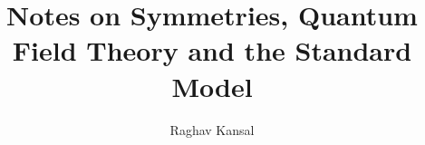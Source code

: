 \documentclass[12pt]{report}
\title{Notes on Symmetries, Quantum Field Theory and the Standard Model}
\author{Raghav Kansal}
\theoremstyle{definition}
\theoremstyle{definition}
\theoremstyle{definition}
\numberwithin{equation}{chapter}
\begin{document}

\maketitle

{
\hypersetup{linkcolor=black}
\tableofcontents
}

\setlength{\parskip}{0.6\baselineskip}

\begin{doublespace}

% 
% 

% 
\end{doublespace}

\nocite{apsrev42Control}

 
\end{document}
